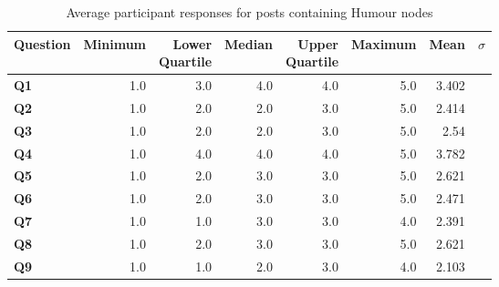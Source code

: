 \begin{table}
\centering
\caption{Average participant responses for posts containing Humour nodes}
\label{table:perception:humour-average}
\begin{tabular}{ l | r | r | r | r | r | r | r}
\textbf{Question} & \textbf{Minimum} & \pbox{2cm}{\textbf{Lower}\\ \textbf{Quartile}} & \textbf{Median} & \pbox{2cm}{\textbf{Upper}\\ \textbf{Quartile}} & \textbf{Maximum} & \textbf{Mean} & \textbf{$\sigma$}\\
\hline
\textbf{Q1} &  1.0 & 3.0 & 4.0 & 4.0 & 5.0 & 3.402 &  \\
\hline
\textbf{Q2} &  1.0 & 2.0 & 2.0 & 3.0 & 5.0 & 2.414 &  \\
\hline
\textbf{Q3} &  1.0 & 2.0 & 2.0 & 3.0 & 5.0 & 2.54 &  \\
\hline
\textbf{Q4} &  1.0 & 4.0 & 4.0 & 4.0 & 5.0 & 3.782 &  \\
\hline
\textbf{Q5} &  1.0 & 2.0 & 3.0 & 3.0 & 5.0 & 2.621 &  \\
\hline
\textbf{Q6} &  1.0 & 2.0 & 3.0 & 3.0 & 5.0 & 2.471 &  \\
\hline
\textbf{Q7} &  1.0 & 1.0 & 3.0 & 3.0 & 4.0 & 2.391 &  \\
\hline
\textbf{Q8} &  1.0 & 2.0 & 3.0 & 3.0 & 5.0 & 2.621 &  \\
\hline
\textbf{Q9} &  1.0 & 1.0 & 2.0 & 3.0 & 4.0 & 2.103 &  \\
\end{tabular}
\end{table}




